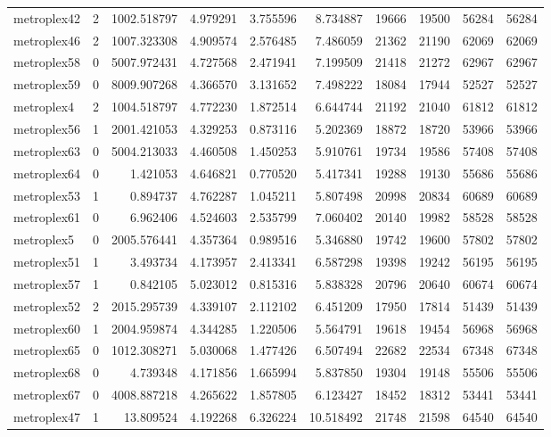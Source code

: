 \begin{longtable}{|l|r|r|r|r|r|r|r|r|r|}
metroplex42 & 2 & 1002.518797 & 4.979291 & 3.755596 & 8.734887 & 19666 & 19500 & 56284 & 56284 \\
metroplex46 & 2 & 1007.323308 & 4.909574 & 2.576485 & 7.486059 & 21362 & 21190 & 62069 & 62069 \\
metroplex58 & 0 & 5007.972431 & 4.727568 & 2.471941 & 7.199509 & 21418 & 21272 & 62967 & 62967 \\
metroplex59 & 0 & 8009.907268 & 4.366570 & 3.131652 & 7.498222 & 18084 & 17944 & 52527 & 52527 \\
metroplex4 & 2 & 1004.518797 & 4.772230 & 1.872514 & 6.644744 & 21192 & 21040 & 61812 & 61812 \\
metroplex56 & 1 & 2001.421053 & 4.329253 & 0.873116 & 5.202369 & 18872 & 18720 & 53966 & 53966 \\
metroplex63 & 0 & 5004.213033 & 4.460508 & 1.450253 & 5.910761 & 19734 & 19586 & 57408 & 57408 \\
metroplex64 & 0 & 1.421053 & 4.646821 & 0.770520 & 5.417341 & 19288 & 19130 & 55686 & 55686 \\
metroplex53 & 1 & 0.894737 & 4.762287 & 1.045211 & 5.807498 & 20998 & 20834 & 60689 & 60689 \\
metroplex61 & 0 & 6.962406 & 4.524603 & 2.535799 & 7.060402 & 20140 & 19982 & 58528 & 58528 \\
metroplex5 & 0 & 2005.576441 & 4.357364 & 0.989516 & 5.346880 & 19742 & 19600 & 57802 & 57802 \\
metroplex51 & 1 & 3.493734 & 4.173957 & 2.413341 & 6.587298 & 19398 & 19242 & 56195 & 56195 \\
metroplex57 & 1 & 0.842105 & 5.023012 & 0.815316 & 5.838328 & 20796 & 20640 & 60674 & 60674 \\
metroplex52 & 2 & 2015.295739 & 4.339107 & 2.112102 & 6.451209 & 17950 & 17814 & 51439 & 51439 \\
metroplex60 & 1 & 2004.959874 & 4.344285 & 1.220506 & 5.564791 & 19618 & 19454 & 56968 & 56968 \\
metroplex65 & 0 & 1012.308271 & 5.030068 & 1.477426 & 6.507494 & 22682 & 22534 & 67348 & 67348 \\
metroplex68 & 0 & 4.739348 & 4.171856 & 1.665994 & 5.837850 & 19304 & 19148 & 55506 & 55506 \\
metroplex67 & 0 & 4008.887218 & 4.265622 & 1.857805 & 6.123427 & 18452 & 18312 & 53441 & 53441 \\
metroplex47 & 1 & 13.809524 & 4.192268 & 6.326224 & 10.518492 & 21748 & 21598 & 64540 & 64540 \\

\end{longtable}

